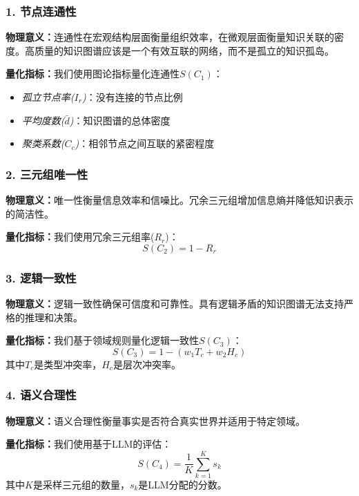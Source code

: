 \documentclass[runningheads]{llncs}
\begin{document}
\subsubsection{1. 节点连通性}
\textbf{物理意义：}连通性在宏观结构层面衡量组织效率，在微观层面衡量知识关联的密度。高质量的知识图谱应该是一个有效互联的网络，而不是孤立的知识孤岛。

\textbf{量化指标：}我们使用图论指标量化连通性$S(C_1)$：
\begin{itemize}
    \item \textit{孤立节点率($I_r$)}：没有连接的节点比例
    \item \textit{平均度数($\bar{d}$)}：知识图谱的总体密度
    \item \textit{聚类系数($C_c$)}：相邻节点之间互联的紧密程度
\end{itemize}

\subsubsection{2. 三元组唯一性}
\textbf{物理意义：}唯一性衡量信息效率和信噪比。冗余三元组增加信息熵并降低知识表示的简洁性。

\textbf{量化指标：}我们使用冗余三元组率($R_r$)：
\begin{equation}
\label{eq:uniqueness_score}
S(C_2) = 1 - R_r
\end{equation}

\subsubsection{3. 逻辑一致性}
\textbf{物理意义：}逻辑一致性确保可信度和可靠性。具有逻辑矛盾的知识图谱无法支持严格的推理和决策。

\textbf{量化指标：}我们基于领域规则量化逻辑一致性$S(C_3)$：
\begin{equation}
\label{eq:consistency_score}
S(C_3) = 1 - (w_1 T_c + w_2 H_c)
\end{equation}
其中$T_c$是类型冲突率，$H_c$是层次冲突率。

\subsubsection{4. 语义合理性}
\textbf{物理意义：}语义合理性衡量事实是否符合真实世界并适用于特定领域。

\textbf{量化指标：}我们使用基于LLM的评估：
\begin{equation}
\label{eq:semantic_score}
S(C_4) = \frac{1}{K} \sum_{k=1}^{K} s_k
\end{equation}
其中$K$是采样三元组的数量，$s_k$是LLM分配的分数。
\end{document}
